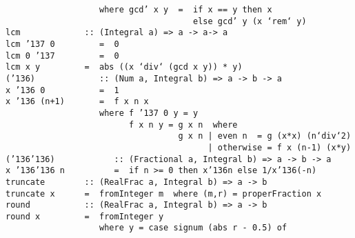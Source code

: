 \mbox{\tt \ \ \ \ \ \ \ \ \ \ \ \ \ \ \ \ \ \ \ where\ gcd'\ x\ y\ \ =\ \ if\ x\ ==\ y\ then\ x}\\
\mbox{\tt \ \ \ \ \ \ \ \ \ \ \ \ \ \ \ \ \ \ \ \ \ \ \ \ \ \ \ \ \ \ \ \ \ \ \ \ \ \ else\ gcd'\ y\ (x\ `rem`\ y)}
%
\eprogB\noindent\bprogB
\mbox{\tt lcm\ \ \ \ \ \ \ \ \ \ \ \ \ ::\ (Integral\ a)\ =>\ a\ ->\ a->\ a}\\
\mbox{\tt lcm\ {\char'137}\ 0\ \ \ \ \ \ \ \ \ =\ \ 0}\\
\mbox{\tt lcm\ 0\ {\char'137}\ \ \ \ \ \ \ \ \ =\ \ 0}\\
\mbox{\tt lcm\ x\ y\ \ \ \ \ \ \ \ \ =\ \ abs\ ((x\ `div`\ (gcd\ x\ y))\ *\ y)}
%
\eprogB\noindent\bprogB
\mbox{\tt ({\char'136})\ \ \ \ \ \ \ \ \ \ \ \ \ ::\ (Num\ a,\ Integral\ b)\ =>\ a\ ->\ b\ ->\ a}\\
\mbox{\tt x\ {\char'136}\ 0\ \ \ \ \ \ \ \ \ \ \ =\ \ 1}\\
\mbox{\tt x\ {\char'136}\ (n+1)\ \ \ \ \ \ \ =\ \ f\ x\ n\ x}\\
\mbox{\tt \ \ \ \ \ \ \ \ \ \ \ \ \ \ \ \ \ \ \ where\ f\ {\char'137}\ 0\ y\ =\ y}\\
\mbox{\tt \ \ \ \ \ \ \ \ \ \ \ \ \ \ \ \ \ \ \ \ \ \ \ \ \ f\ x\ n\ y\ =\ g\ x\ n\ \ where}\\
\mbox{\tt \ \ \ \ \ \ \ \ \ \ \ \ \ \ \ \ \ \ \ \ \ \ \ \ \ \ \ \ \ \ \ \ \ \ \ g\ x\ n\ |\ even\ n\ \ =\ g\ (x*x)\ (n`div`2)}\\
\mbox{\tt \ \ \ \ \ \ \ \ \ \ \ \ \ \ \ \ \ \ \ \ \ \ \ \ \ \ \ \ \ \ \ \ \ \ \ \ \ \ \ \ \ |\ otherwise\ =\ f\ x\ (n-1)\ (x*y)}
%
\eprogB\noindent\bprogB
\mbox{\tt ({\char'136}{\char'136})\ \ \ \ \ \ \ \ \ \ \ \ ::\ (Fractional\ a,\ Integral\ b)\ =>\ a\ ->\ b\ ->\ a}\\
\mbox{\tt x\ {\char'136}{\char'136}\ n\ \ \ \ \ \ \ \ \ \ =\ \ if\ n\ >=\ 0\ then\ x{\char'136}n\ else\ 1/x{\char'136}(-n)}
%
\eprogB\noindent\bprogB
\mbox{\tt truncate\ \ \ \ \ \ \ \ ::\ (RealFrac\ a,\ Integral\ b)\ =>\ a\ ->\ b}\\
\mbox{\tt truncate\ x\ \ \ \ \ \ =\ \ fromInteger\ m\ \ where\ (m,r)\ =\ properFraction\ x}
%
\eprogB\noindent\bprogB
\mbox{\tt round\ \ \ \ \ \ \ \ \ \ \ ::\ (RealFrac\ a,\ Integral\ b)\ =>\ a\ ->\ b}\\
\mbox{\tt round\ x\ \ \ \ \ \ \ \ \ =\ \ fromInteger\ y}\\
\mbox{\tt \ \ \ \ \ \ \ \ \ \ \ \ \ \ \ \ \ \ \ where\ y\ =\ case\ signum\ (abs\ r\ -\ 0.5)\ of}\\

